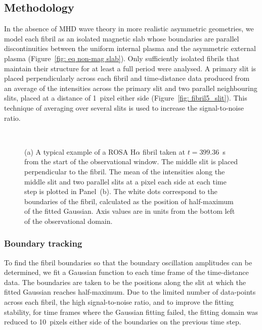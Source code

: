 \documentclass[12pt]{../style-files/ociamthesis}
\newcommand{\figdir}{../main/figures/chpt-5/} %
\begin{document}
\subsection{Methodology}

In the absence of MHD wave theory in more realistic asymmetric geometries, we model each fibril as an isolated magnetic slab whose boundaries are parallel discontinuities between the uniform internal plasma and the asymmetric external plasma (Figure~\ref{fig: eq non-mag slab}). Only sufficiently isolated fibrils that maintain their structure for at least a full period were analysed. A primary slit is placed perpendicularly across each fibril and time-distance data produced from an average of the intensities across the primary slit and two parallel neighbouring slits, placed at a distance of 1~pixel either side (Figure~\ref{fig: fibril5_slit}). This technique of averaging over several slits is used to increase the signal-to-noise ratio.

\begin{figure}
	\centering
	 \\
	\caption{(a) A typical example of a ROSA H$\alpha$ fibril taken at $t=399.36$~s from the start of the observational window. The middle slit is placed perpendicular to the fibril. The mean of the intensities along the middle slit and two parallel slits at a pixel each side at each time step is plotted in Panel~(b). The white dots correspond to the boundaries of the fibril, calculated as the position of half-maximum of the fitted Gaussian. Axis values are in units from the bottom left of the observational domain.}
\end{figure}


\subsubsection{Boundary tracking} \label{sec:boundary tracking}

To find the fibril boundaries so that the boundary oscillation amplitudes can be determined, we fit a Gaussian function to each time frame of the time-distance data. The boundaries are taken to be the positions along the slit at which the fitted Gaussian reaches half-maximum. Due to the limited number of data-points across each fibril, the high signal-to-noise ratio, and to improve the fitting stability, for time frames where the Gaussian fitting failed, the fitting domain was reduced to 10~pixels either side of the boundaries on the previous time step.
\end{document}
